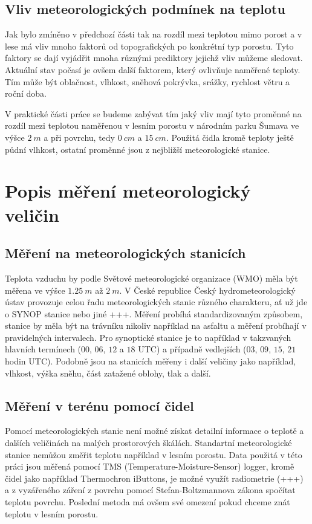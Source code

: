 \subsection{Vliv meteorologických podmínek na teplotu}
Jak bylo zmíněno v předchozí části tak na rozdíl mezi teplotou mimo porost a v lese má vliv mnoho faktorů od topografických po konkrétní typ porostu. Tyto faktory se dají vyjádřit mnoha různými prediktory jejichž vliv můžeme sledovat. Aktuální stav počasí je ovšem další faktorem, který ovlivňuje naměřené teploty. Tím může být oblačnost, vlhkost, sněhová pokrývka, srážky, rychlost větru a roční doba.

V praktické části práce se budeme zabývat tím jaký vliv mají tyto proměnné na rozdíl mezi teplotou naměřenou v lesním porostu v národním parku Šumava ve výšce $\SI{2}{m}$ a při povrchu, tedy $\SI{0}{cm}$ a $\SI{15}{cm}$. Použitá čidla kromě teploty ještě půdní vlhkost, ostatní proměnné jsou z nejbližší meteorologické stanice.

\section{Popis měření meteorologický veličin} \label{chap:measure}
\subsection{Měření na meteorologických stanicích}
Teplota vzduchu by podle Světové meteorologické organizace (WMO) měla být měřena ve výšce $\SI{1.25}{m}$ až $\SI{2}{m}$\cite{wmoGuidance2021}. V České republice Český hydrometeorologický ústav provozuje celou řadu meteorologických stanic různého charakteru, ať už jde o SYNOP stanice nebo jiné +++. Měření probíhá standardizovaným způsobem, stanice by měla být na trávníku nikoliv například na asfaltu a měření probíhají v pravidelných intervalech. Pro synoptické stanice je to například v takzvaných hlavních termínech ($00$, $06$, $12$ a $18$ UTC) a případně vedlejších ($03$, $09$, $15$, $21$ hodin UTC). Podobně jsou na stanicích měřeny i další veličiny jako například, vlhkost, výška sněhu, část zatažené oblohy, tlak a další. 

\subsection{Měření v terénu pomocí čidel}
Pomocí meteorologických stanic není možné získat detailní informace o teplotě a dalších veličinách na malých prostorových škálách. Standartní meteorologické stanice nemůžou změřit teplotu například v lesním porostu. Data použitá v této práci jsou měřená pomocí TMS (Temperature-Moisture-Sensor) logger, kromě čidel jako například Thermochron iButtons, je možné využít radiometrie (+++) a z vyzářeného záření z povrchu pomocí Stefan-Boltzmannova zákona spočítat teplotu povrchu. Poslední metoda má ovšem své omezení pokud chceme znát teplotu v lesním porostu. 


